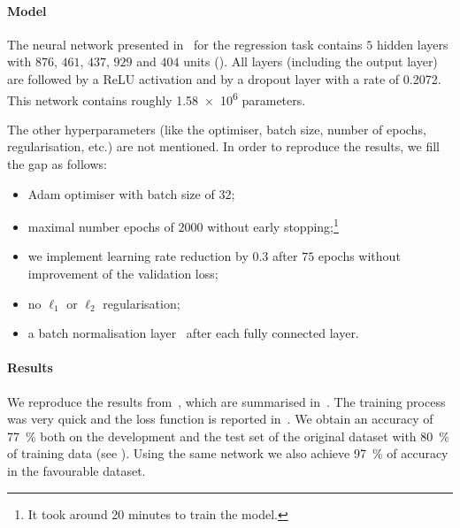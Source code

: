 \paragraph{Model}

The neural network presented in~\cite{Bull:2018:MachineLearningCICY} for the regression task contains $5$ hidden layers with $876$, $461$, $437$, $929$ and $404$ units ().
All layers (including the output layer) are followed by a ReLU activation and by a dropout layer with a rate of \num{0.2072}.
This network contains roughly \num{1.58e6} parameters.

The other hyperparameters (like the optimiser, batch size, number of epochs, regularisation, etc.) are not mentioned.
In order to reproduce the results, we fill the gap as follows:
\begin{itemize}
    \item Adam optimiser with batch size of $32$;
    
    \item maximal number epochs of $2000$ without early stopping;\footnote{It took around 20 minutes to train the model.}
    
    \item we implement learning rate reduction by $0.3$ after $75$ epochs without improvement of the validation loss;
    
    \item no $\ell_1$ or $\ell_2$ regularisation;
    
    \item a batch normalisation layer~\cite{Ioffe:2015:BatchNormalizationAccelerating} after each fully connected layer.
\end{itemize}


\paragraph{Results}

We reproduce the results from~\cite{Bull:2018:MachineLearningCICY}, which are summarised in~.
The training process was very quick and the loss function is reported in~.
We obtain an accuracy of \SI{77}{\percent} both on the development and the test set of the original dataset with \SI{80}{\percent} of training data (see ).
Using the same network we also achieve \SI{97}{\percent} of accuracy in the favourable dataset.

